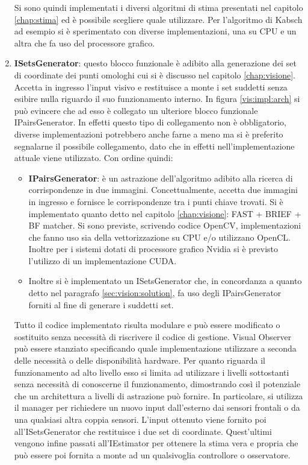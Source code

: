 \begin{enumerate}
	Si sono quindi implementati i diversi algoritmi di stima presentati nel capitolo \ref{chap:stima} ed è possibile scegliere quale utilizzare. Per l'algoritmo di Kabsch ad esempio si è sperimentato con diverse implementazioni, una su CPU e un altra che fa uso del processore grafico.
	
	\item \textbf{ISetsGenerator}: questo blocco funzionale è adibito alla generazione dei set di coordinate dei punti omologhi cui si è discusso nel capitolo \ref{chap:visione}. Accetta in ingresso l'input visivo e restituisce a monte i set suddetti senza esibire nulla riguardo il suo funzionamento interno. In figura \ref{vis:impl:arch} si può evincere che ad esso è collegato un ulteriore blocco funzionale IPairsGenerator. In effetti questo tipo di collegamento non è obbligatorio, diverse implementazioni potrebbero anche farne a meno ma si è preferito segnalarne il possibile collegamento, dato che in effetti nell'implementazione attuale viene utilizzato. Con ordine quindi:
	\begin{itemize}
		\item \textbf{IPairsGenerator}: è un astrazione dell'algoritmo adibito alla ricerca di corrispondenze in due immagini. Concettualmente, accetta due immagini in ingresso e fornisce le corrispondenze tra i punti chiave trovati. Si è implementato quanto detto nel capitolo \ref{chap:visione}: FAST + BRIEF + BF matcher. Si sono previste, scrivendo codice OpenCV, implementazioni che fanno uso sia della vettorizzazione su CPU e/o utilizzano OpenCL. Inoltre per i sistemi dotati di processore grafico Nvidia si è previsto l'utilizzo di un implementazione CUDA.
		\item Inoltre si è implementato un ISetsGenerator che, in concordanza a quanto detto nel paragrafo \ref{sec:vision:solution}, fa uso degli IPairsGenerator forniti al fine di generare i suddetti set.
	\end{itemize}
	Tutto il codice implementato risulta modulare e può essere modificato o sostituito senza necessità di riscrivere il codice di gestione. Visual Observer può essere stanziato specificando quale implementazione utilizzare a seconda delle necessità o delle disponibilità hardware. Per quanto riguarda il funzionamento ad alto livello esso si limita ad utilizzare i livelli sottostanti senza necessità di conoscerne il funzionamento, dimostrando così il potenziale che un architettura a livelli di astrazione può fornire. In particolare, si utilizza il manager per richiedere un nuovo input dall'esterno dai sensori frontali o da una qualsiasi altra coppia sensori. L'input ottenuto viene fornito poi all'ISetsGenerator che restituisce i due set di coordinate. Quest'ultimi vengono infine passati all'IEstimator per ottenere la stima vera e propria che può essere poi fornita a monte ad un qualsivoglia controllore o osservatore.
	 
\end{enumerate}
